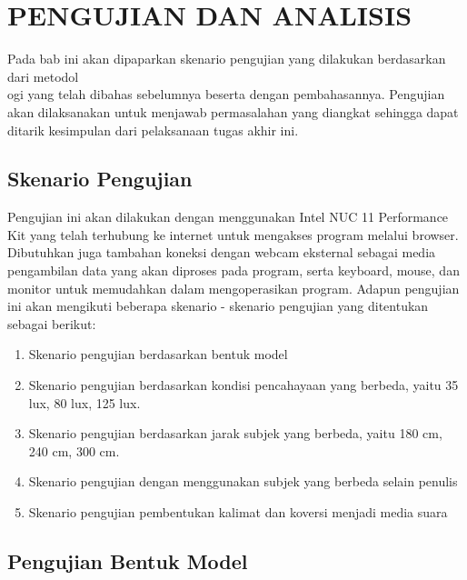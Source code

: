 \chapter{PENGUJIAN DAN ANALISIS}
\label{chap:pengujiananalisis}


Pada bab ini akan dipaparkan skenario pengujian yang  dilakukan berdasarkan dari metodol\\ogi yang telah dibahas sebelumnya beserta dengan pembahasannya. Pengujian akan dilaksanakan untuk menjawab permasalahan yang diangkat sehingga dapat ditarik kesimpulan dari pelaksanaan tugas akhir ini.

\section{Skenario Pengujian}
\label{sec:skenariopengujian}

Pengujian ini akan dilakukan dengan menggunakan Intel NUC 11 Performance Kit yang telah terhubung ke internet untuk mengakses program melalui browser. Dibutuhkan juga tambahan koneksi dengan webcam eksternal sebagai media pengambilan data yang akan diproses pada program, serta keyboard, mouse, dan monitor untuk memudahkan dalam mengoperasikan program. Adapun pengujian ini akan mengikuti beberapa skenario - skenario pengujian yang ditentukan sebagai berikut:

\begin{enumerate}
  \item Skenario pengujian berdasarkan bentuk model
  \item Skenario pengujian berdasarkan kondisi pencahayaan yang berbeda, yaitu 35 lux, 80 lux, 125 lux. 
  \item Skenario pengujian berdasarkan jarak subjek yang berbeda, yaitu 180 cm, 240 cm, 300 cm.
  \item Skenario pengujian dengan menggunakan subjek yang berbeda selain penulis
  \item Skenario pengujian pembentukan kalimat dan koversi menjadi media suara
\end{enumerate}

\section{Pengujian Bentuk Model}
\label{sec:analisismodel}

